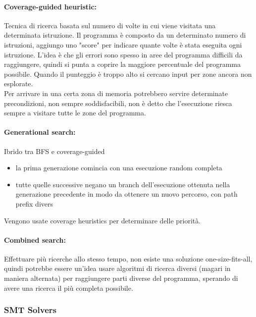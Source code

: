\paragraph{Coverage-guided heuristic:} Tecnica di ricerca basata sul numero di volte in cui viene visitata una determinata istruzione. Il programma è composto da un determinato numero di istruzioni, aggiungo uno "score" per indicare quante volte è stata eseguita ogni istruzione. L'idea è che gli errori sono spesso in aree del programma difficili da raggiungere, quindi si punta a coprire la maggiore percentuale del programma possibile. Quando il punteggio è troppo alto si cercano input per zone ancora non esplorate.\\

Per arrivare in una certa zona di memoria potrebbero servire determinate precondizioni, non sempre soddisfacibili, non è detto che l'esecuzione riesca sempre a visitare tutte le zone del programma.\\

\paragraph{Generational search:} Ibrido tra BFS e coverage-guided
\begin{itemize}
	\item la prima generazione comincia con una esecuzione random completa
	\item tutte quelle successive negano un branch dell'esecuzione ottenuta nella generazione precedente in modo da ottenere un nuovo percorso, con path prefix divers 
\end{itemize}
Vengono usate coverage heuristics per determinare delle priorità.\\

\paragraph{Combined search:} Effettuare più ricerche allo stesso tempo, non esiste una soluzione one-size-fits-all, quindi potrebbe essere un'idea usare algoritmi di ricerca diversi (magari in maniera alternata) per raggiungere parti diverse del programma, sperando di avere una ricerca il più completa possibile.\\

\subsubsection{SMT Solvers}

